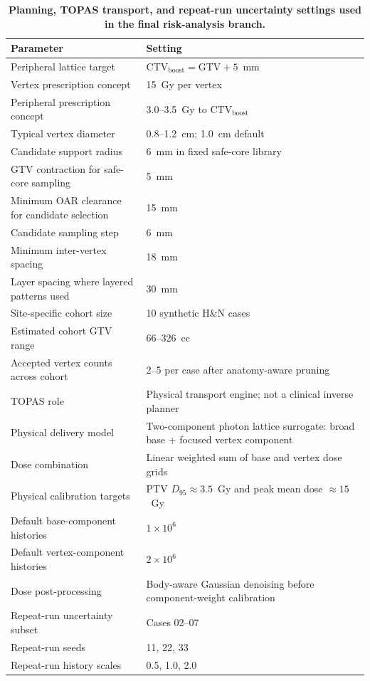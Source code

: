 \begin{table}[H]
\centering
\caption{\textbf{Planning, TOPAS transport, and repeat-run uncertainty settings used in the final risk-analysis branch.}}
\label{tab:planning_transport_parameters}
\small
\begin{tabular}{p{5.2cm}p{7.5cm}}
\toprule
Parameter & Setting \\
\midrule
Peripheral lattice target & $\mathrm{CTV}_{\mathrm{boost}} = \mathrm{GTV} + 5$~mm \\
Vertex prescription concept & 15~Gy per vertex \\
Peripheral prescription concept & 3.0--3.5~Gy to $\mathrm{CTV}_{\mathrm{boost}}$ \\
Typical vertex diameter & 0.8--1.2~cm; 1.0~cm default \\
Candidate support radius & 6~mm in fixed safe-core library \\
GTV contraction for safe-core sampling & 5~mm \\
Minimum OAR clearance for candidate selection & 15~mm \\
Candidate sampling step & 6~mm \\
Minimum inter-vertex spacing & 18~mm \\
Layer spacing where layered patterns used & 30~mm \\
Site-specific cohort size & 10 synthetic H\&N cases \\
Estimated cohort GTV range & 66--326~cc \\
Accepted vertex counts across cohort & 2--5 per case after anatomy-aware pruning \\
TOPAS role & Physical transport engine; not a clinical inverse planner \\
Physical delivery model & Two-component photon lattice surrogate: broad base + focused vertex component \\
Dose combination & Linear weighted sum of base and vertex dose grids \\
Physical calibration targets & PTV $D_{95} \approx 3.5$~Gy and peak mean dose $\approx 15$~Gy \\
Default base-component histories & $1\times10^{6}$ \\
Default vertex-component histories & $2\times10^{6}$ \\
Dose post-processing & Body-aware Gaussian denoising before component-weight calibration \\
Repeat-run uncertainty subset & Cases 02--07 \\
Repeat-run seeds & 11, 22, 33 \\
Repeat-run history scales & 0.5, 1.0, 2.0 \\
\bottomrule
\end{tabular}
\end{table}
